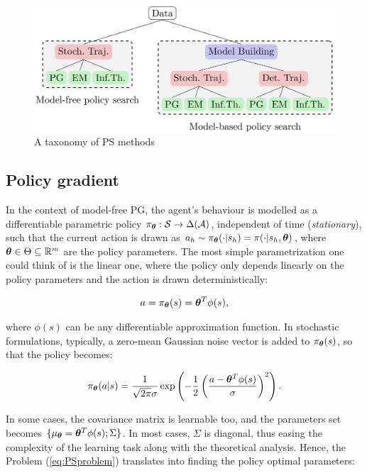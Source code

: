 \begin{figure}[t!]
\centering
\includegraphics[width=\textwidth,height=\textheight,keepaspectratio]{Images/ps_taxonomy.png}
\caption{A taxonomy of \gls{PS} methods \cite{deisenroth2013survey}} \label{fig:PStaxonomy}
\end{figure}



\subsection{Policy gradient}
In the context of model-free \gls{PG}, the agent's behaviour is modelled as a differentiable parametric policy $\pi_{\boldsymbol{\theta}}:\mathcal{S}\to\Delta(\mathcal{A})$, independent of time (\emph{stationary}), such that the current action is drawn as $a_h\sim\pi_{\boldsymbol{\theta}}(\cdot|s_h)=\pi(\cdot|s_h, \boldsymbol{\theta})$, where $\boldsymbol{\theta}\in\Theta\subseteq\mathbb{R}^m$ are the policy parameters. The most simple parametrization one could think of is the linear one, where the policy only depends linearly on the policy parameters and the action is drawn deterministically:

\begin{align}
a = \pi_{\boldsymbol{\theta}}(s) = \boldsymbol{\theta}^T\phi(s),
\end{align}

where $\phi(s)$ can be any differentiable approximation function. In stochastic formulations, typically, a zero-mean Gaussian noise vector is added to $\pi_{\boldsymbol{\theta}}(s)$, so that the policy becomes:

\begin{align}
\pi_{\boldsymbol{\theta}}(a|s) = \frac{1}{\sqrt{2\pi}\sigma}\exp\left(-\frac{1}{2}\left(\frac{a-\boldsymbol{\theta}^T\phi(s)}{\sigma}\right)^2\right).
\end{align}

In some cases, the covariance matrix is learnable too, and the parameters set becomes $\{\mu_{\boldsymbol{\theta}}=\boldsymbol{\theta}^T\phi(s); \Sigma\}$. In most cases, $\Sigma$ is diagonal, thus easing the complexity of the learning task along with the theoretical analysis. Hence, the Problem (\ref{eq:PSproblem}) translates into finding the policy optimal parameters:

